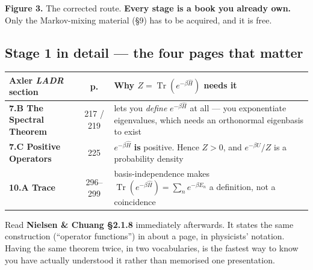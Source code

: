 \vspace{2pt}
\begin{center}\begin{minipage}{0.93\textwidth}\footnotesize\color{slate}
\textbf{Figure 3.}\; The corrected route. \textbf{Every stage is a book you already own.} Only the
Markov-mixing material (§9) has to be acquired, and it is free.
\end{minipage}\end{center}

\subsection{Stage 1 in detail --- the four pages that matter}

\begin{center}\small
\begin{tabular}{@{}>{\raggedright\arraybackslash}p{4.2cm}c>{\raggedright\arraybackslash}p{9.8cm}@{}}
\toprule
\rowcolor{bio!13}
\textbf{\color{bio}Axler \textit{LADR} section} & \textbf{p.} & \textbf{\color{bio}Why $Z=\operatorname{Tr}(e^{-\beta\hat H})$ needs it}\\
\midrule
\textbf{7.B The Spectral Theorem} & 217 / 219 &
 lets you \emph{define} $e^{-\beta\hat H}$ at all --- you exponentiate eigenvalues, which needs an
 orthonormal eigenbasis to exist\\
\textbf{7.C Positive Operators} & 225 &
 $e^{-\beta\hat H}$ \textbf{is} positive. Hence $Z>0$, and $e^{-\beta U}/Z$ is a probability density\\
\textbf{10.A Trace} & 296--299 &
 basis-independence makes $\operatorname{Tr}(e^{-\beta\hat H})=\sum_n e^{-\beta E_n}$ a definition,
 not a coincidence\\
\bottomrule
\end{tabular}
\end{center}

\begin{haveit}[title={Cross-check as you go}]
Read \textbf{Nielsen \& Chuang §2.1.8} immediately afterwards. It states the same construction
(``operator functions'') in about a page, in physicists' notation. Having the same theorem twice, in
two vocabularies, is the fastest way to know you have actually understood it rather than memorised
one presentation.
\end{haveit}
